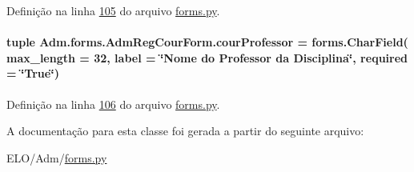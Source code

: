 Definição na linha \hyperlink{Adm_2forms_8py_source_l00105}{105} do arquivo \hyperlink{Adm_2forms_8py_source}{forms.\+py}.

\hypertarget{classAdm_1_1forms_1_1AdmRegCourForm_a6fcfad36a149364899dc7c95f239691f}{}
\paragraph[{cour\+Professor}]{\setlength{\rightskip}{0pt plus 5cm}tuple Adm.\+forms.\+Adm\+Reg\+Cour\+Form.\+cour\+Professor = forms.\+Char\+Field( max\+\_\+length = 32, label = \char`\"{}Nome do Professor da Disciplina\char`\"{}, required = \char`\"{}True\char`\"{})\hspace{0.3cm}{\ttfamily [static]}}\label{classAdm_1_1forms_1_1AdmRegCourForm_a6fcfad36a149364899dc7c95f239691f}


Definição na linha \hyperlink{Adm_2forms_8py_source_l00106}{106} do arquivo \hyperlink{Adm_2forms_8py_source}{forms.\+py}.



A documentação para esta classe foi gerada a partir do seguinte arquivo\+:\begin{DoxyCompactItemize}
\item 
E\+L\+O/\+Adm/\hyperlink{Adm_2forms_8py}{forms.\+py}\end{DoxyCompactItemize}
